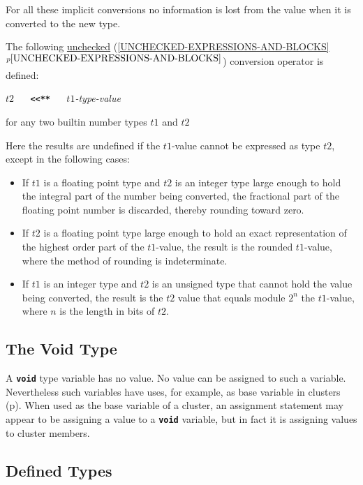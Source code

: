 \documentclass[12pt]{article}
\makeatletter
\newcommand{\TT}[1]{{\tt \bfseries #1}}
\newcommand{\ttkey}[1]{\TT{#1}\index{#1@{\tt #1}}}
\newcommand{\itemref}[1]{\ref{#1}$^{p\pageref{#1}}$}
\newcommand{\pagref}[1]{p\pageref{#1}}
\makeatother
\begin{document}
For all these implicit conversions no information is lost from
the value when it is converted to the new type.

The following \underline{unchecked} (\itemref{UNCHECKED-EXPRESSIONS-AND-BLOCKS})
conversion operator is defined:
\begin{center}

$t2$ ~~ \TT{<{}<**} ~~ $t1${\em -type-value}%
\label{<<**}

for any two builtin number types $t1$ and $t2$

\end{center}

Here the results are undefined if the $t1$-value cannot be expressed
as type $t2$, except in the following cases:
\begin{itemize}
\item If $t1$ is a floating point type
and $t2$ is an integer type large enough to hold the integral part
of the number being converted, the fractional part of
the floating point number is discarded, thereby rounding toward
zero.
\item If $t2$ is a floating point type large
enough to hold an exact representation of the highest order
part of the $t1$-value, the result is the rounded $t1$-value,
where the method of rounding is indeterminate.
\item If $t1$ is an integer type and $t2$ is an unsigned type that cannot
hold the value being converted, the result is the $t2$ value that
equals module $2^n$ the $t1$-value, where $n$ is the length in bits
of $t2$.
\end{itemize}


\subsection{The Void Type}
\label{THE-VOID-TYPE}

A \ttkey{void} type variable has no value.  No value can be
assigned to such a variable.  Nevertheless such variables have
uses, for example, as base variable in clusters (\pagref{CLUSTERS}).
When used as the base variable of a cluster, an assignment statement
may appear to be assigning a value to a \TT{void} variable, but
in fact it is assigning values to cluster members.


\subsection{Defined Types}
\label{DEFINED-TYPES}
\end{document}
